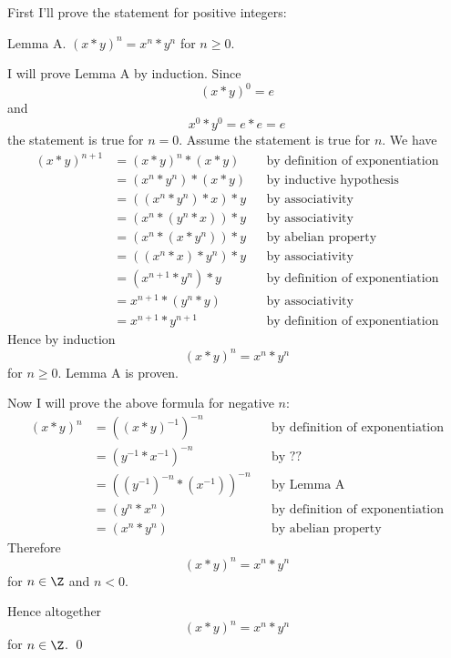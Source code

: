 First I'll prove the statement for positive integers:

Lemma A.
$(x * y)^n = x^n * y^n$ for $n \geq 0$.

I will prove Lemma A by induction.
Since
\[
(x * y)^0 = e
\]
and
\[
x^0 * y^0 = e * e = e
\]
the statement is true for $n = 0$.
Assume the statement is true for $n$.
We have
\begin{align*}
(x * y)^{n+1}
&= (x * y)^{n} * (x * y) & & \text{by definition of exponentiation}\\
&= (x^n * y^n) * (x * y) & & \text{by inductive hypothesis} \\
&= ((x^n * y^n) * x) * y & & \text{by associativity} \\
&= (x^n * (y^n * x)) * y & & \text{by associativity} \\
&= (x^n * (x * y^n)) * y & & \text{by abelian property} \\
&= ((x^n * x) * y^n) * y & & \text{by associativity} \\
&= (x^{n+1} * y^n) * y    & & \text{by definition of exponentiation}\\
&= x^{n+1} * (y^n * y)    & & \text{by associativity}\\
&= x^{n+1} * y^{n+1}       & & \text{by definition of exponentiation}
\end{align*}
Hence by induction
\[
(x * y)^n = x^n * y^n
\]
for $n \geq 0$.
Lemma A is proven.

Now I will prove the above formula for negative $n$:
\begin{align*}
(x * y)^n
&= ((x * y)^{-1})^{-n}            & & \text{by definition of exponentiation}\\
&= (y^{-1} * x^{-1})^{-n}          & & \text{by ??} \\
&= ((y^{-1})^{-n} * (x^{-1}))^{-n}  & & \text{by Lemma A} \\
&= (y^{n} * x^{n})                & & \text{by definition of exponentiation}\\
&= (x^{n} * y^{n})                & & \text{by abelian property}
\end{align*}
Therefore
\[
(x * y)^n = x^n * y^n
\]
for $n \in \Z$ and $n < 0$.

Hence altogether
\[
(x * y)^n = x^n * y^n
\]
for $n \in \Z$.
\qed
